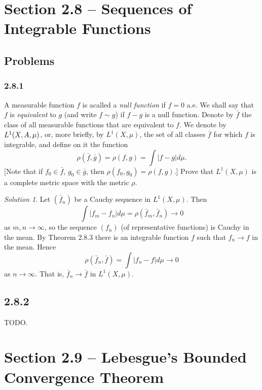 \documentclass{report}
\let\cal\relax
\newcommand{\cal}[1]{\mathcal{#1}}
\theoremstyle{remark}
\newtheorem*{solution}{Solution}
\begin{document}
\section*{Section 2.8 -- Sequences of Integrable Functions}

\subsection*{Problems}

\subsubsection*{2.8.1}
A measurable function $f$ is acalled a \emph{null function} if $f = 0$ a.e. We shall say that $f$ is \emph{equivalent} to $g$ (and write $f \sim g$) if $f - g$ is a null function. Denote by $\bar f$ the class of all measurable functions that are equivalent to $f$. We denote by $L^1(X, \cal A, \mu)$, or, more briefly, by $L^1(X,\mu)$, the set of all classes $\bar f$ for which $f$ is integrable, and define on it the function
\begin{equation*}
  \rho(\bar f, \bar g) = \rho(f, g) = \int |f-g| d\mu.
\end{equation*}
[Note that if $f_0 \in \bar f$, $g_0 \in \bar g$, then $\rho(f_0,g_0) = \rho(f,g)$.] Prove that $L^1(X,\mu)$ is a complete metric space with the metric $\rho$.

\begin{solution}
  Let $(\bar f_n)$ be a Cauchy sequence in $L^1(X,\mu)$. Then
  \begin{equation*}
    \int |f_m - f_n| d\mu = \rho(\bar f_m, \bar f_n) \to 0
  \end{equation*}
  as $m,n \to \infty$, so the sequence $(f_n)$ (of representative functions) is Cauchy in the mean. By Theorem 2.8.3 there is an integrable function $f$ such that $f_n \to f$ in the mean. Hence
  \begin{equation*}
    \rho(\bar f_n, \bar f) = \int |f_n - f| d\mu \to 0
  \end{equation*}
  as $n \to \infty$. That is, $\bar f_n \to \bar f$ in $L^1(X,\mu)$.
\end{solution}

\subsection*{2.8.2}
TODO.


\section*{Section 2.9 -- Lebesgue's Bounded Convergence Theorem}
\end{document}
